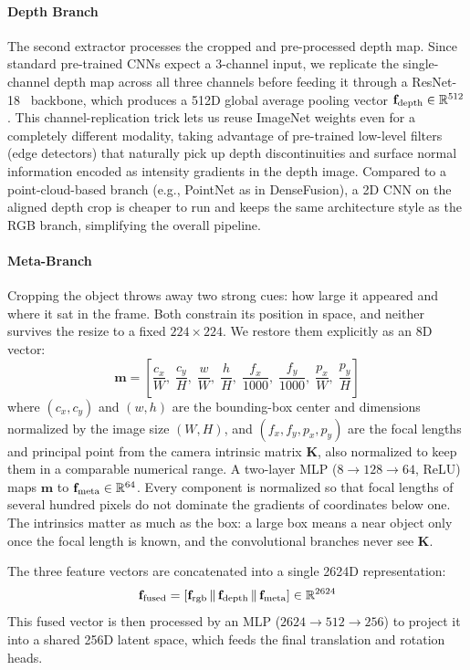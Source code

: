 \paragraph{Depth Branch}
The second extractor processes the cropped and pre-processed depth map.
Since standard pre-trained CNNs expect a 3-channel input, we replicate the single-channel depth map across all three channels before feeding it through a ResNet-18~\cite{he2016deep} backbone, which produces a 512D global average pooling vector $\mathbf{f}_{\text{depth}} \in \mathbb{R}^{512}$.
This channel-replication trick lets us reuse ImageNet weights even for a completely different modality, taking advantage of pre-trained low-level filters (edge detectors) that naturally pick up depth discontinuities and surface normal information encoded as intensity gradients in the depth image.
Compared to a point-cloud-based branch (e.g., PointNet as in DenseFusion), a 2D CNN on the aligned depth crop is cheaper to run and keeps the same architecture style as the RGB branch, simplifying the overall pipeline.


\paragraph{Meta-Branch}
Cropping the object throws away two strong cues: how large it appeared and where it sat in the frame. Both constrain its position in space, and neither survives the resize to a fixed $224\times224$. We restore them explicitly as an 8D vector:
\begin{equation}
\mathbf{m} = \left[\frac{c_x}{W},\; \frac{c_y}{H},\; \frac{w}{W},\; \frac{h}{H},\; \frac{f_x}{1000},\; \frac{f_y}{1000},\; \frac{p_x}{W},\; \frac{p_y}{H}\right]
\label{eq:meta}
\end{equation}
where $(c_x, c_y)$ and $(w, h)$ are the bounding-box center and dimensions normalized by the image size $(W, H)$, and $(f_x, f_y, p_x, p_y)$ are the focal lengths and principal point from the camera intrinsic matrix $\mathbf{K}$, also normalized to keep them in a comparable numerical range.
A two-layer MLP ($8 \rightarrow 128 \rightarrow 64$, ReLU) maps $\mathbf{m}$ to $\mathbf{f}_{\text{meta}} \in \mathbb{R}^{64}$. Every component is normalized so that focal lengths of several hundred pixels do not dominate the gradients of coordinates below one. The intrinsics matter as much as the box: a large box means a near object only once the focal length is known, and the convolutional branches never see $\mathbf{K}$.

The three feature vectors are concatenated into a single 2624D representation:
\begin{equation}
    \mathbf{f}_{\text{fused}} = [\mathbf{f}_{\text{rgb}} \,\|\, \mathbf{f}_{\text{depth}} \,\|\, \mathbf{f}_{\text{meta}}] \in \mathbb{R}^{2624}
    \label{eq:concat}
\end{equation}
This fused vector is then processed by an MLP ($2624 \rightarrow 512 \rightarrow 256$) to project it into a shared 256D latent space, which feeds the final translation and rotation heads.

